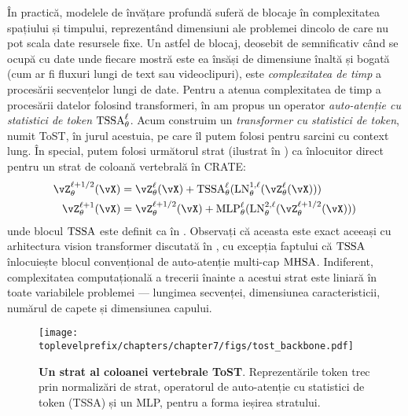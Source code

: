 \documentclass[../../book-main_ro.tex]{subfiles}
\begin{document}
În practică, modelele de învățare profundă suferă de blocaje în complexitatea spațiului și timpului, reprezentând dimensiuni ale problemei dincolo de care nu pot scala date resursele fixe. Un astfel de blocaj, deosebit de semnificativ când se ocupă cu date unde fiecare mostră este ea însăși de dimensiune înaltă și bogată (cum ar fi fluxuri lungi de text sau videoclipuri), este \textit{complexitatea de timp} a procesării secvențelor lungi de date. Pentru a atenua complexitatea de timp a procesării datelor folosind transformeri, în  am propus un operator \textit{auto-atenție cu statistici de token} \(\operatorname{TSSA}_{\theta}^{\ell}\). Acum construim un \textit{transformer cu statistici de token}, numit ToST, în jurul acestuia, pe care îl putem folosi pentru sarcini cu context lung. În special, putem folosi următorul strat (ilustrat în ) ca înlocuitor direct pentru un strat de coloană vertebrală în CRATE:
\begin{align}
    \vZ_{\theta}^{\ell + 1/2}(\vX)
    &= \vZ_{\theta}^{\ell}(\vX) + \TSSA_{\theta}^{\ell}(\LN_{\theta}^{1, \ell}(\vZ_{\theta}^{\ell}(\vX))) \\ 
    \vZ_{\theta}^{\ell + 1}(\vX)
    &= \vZ_{\theta}^{\ell + 1/2}(\vX) + \MLP_{\theta}^{\ell}(\LN_{\theta}^{2, \ell}(\vZ_{\theta}^{\ell + 1/2}(\vX)))
\end{align}
unde blocul \(\operatorname{TSSA}\) este definit ca în . Observați că aceasta este exact aceeași cu arhitectura vision transformer discutată în , cu excepția faptului că \(\operatorname{TSSA}\) înlocuiește blocul convențional de auto-atenție multi-cap \(\operatorname{MHSA}\). Indiferent, complexitatea computațională a trecerii înainte a acestui strat este liniară în toate variabilele problemei --- lungimea secvenței, dimensiunea caracteristicii, numărul de capete și dimensiunea capului.

\begin{figure}[!htbp]
    \centering 
    \texttt{[image: \\toplevelprefix/chapters/chapter7/figs/tost\_backbone.pdf]}
    \caption{\small\textbf{Un strat al coloanei vertebrale ToST}. Reprezentările token trec prin normalizări de strat, operatorul de auto-atenție cu statistici de token (TSSA) și un MLP, pentru a forma ieșirea stratului.}
    \label{fig:tost_backbone}
\end{figure}
\end{document}
